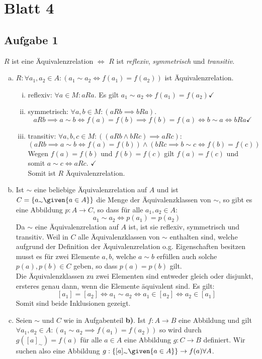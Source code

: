 \section*{Blatt 4}

	\subsection*{Aufgabe 1}
  $R$ ist eine Äquivalenzrelation $\iff$ $R$ ist \emph{reflexiv}, \emph{symmetrisch} und \emph{transitiv}.
  \begin{enumerate}[a)]
  \item $R: \forall a_1,a_2 \in A: (a_1 \sim a_2 \iff f(a_1)=f(a_2))$ ist Äquivalenzrelation. \\

    \begin{enumerate}[i)]
      \item reflexiv: $\forall a \in M: aRa$. Es gilt $a_1 \sim a_2 \iff f(a_1) = f(a_2) \checkmark$
      \item symmetrisch: $ \forall a, b \in M: (aRb \implies bRa)$. \\
      \[ aRb \implies a \sim b \iff f(a) = f(b) \implies f(b) = f(a) \iff b \sim a \iff bRa  \checkmark \]
      \item transitiv: $ \forall a,b,c \in M: ((aRb \land bRc) \implies aRc)  $:\\
      \[  (aRb \implies a \sim b \iff f(a) = f(b)) \land (bRc \implies b \sim c \iff f(b) = f(c))  \]
      Wegen $f(a) = f(b)$ und $f(b) = f(c)$ gilt $f(a)=f(c)$ und somit $a \sim c \iff aRc$. $\checkmark$ \\
      Somit ist $R$ Äquivalenzrelation.
    \end{enumerate}
  \item Ist $\sim$ eine beliebige Äquivalenzrelation auf $A$ und ist $C = \{a_{\sim} \given{ a \in A} \}$ die Menge der Äquivalenzklassen von $\sim$, so gibt es eine Abbildung $p: A \to C$, so dass für alle $a_1, a_2 \in A$:\\
    \[a_1 \sim a_2 \iff p(a_1) = p(a_2)\]
  Da $\sim$ eine Äquivalenzrelation auf $A$ ist, ist sie reflexiv, symmetrisch und transitiv. Weil in $C$ alle Äquivalenzklassen von $\sim$ enthalten sind, welche aufgrund der Definition der Äquivalenzrelation o.g. Eigenschaften besitzen musst es für zwei Elemente $a, b$, welche $a \sim b$ erfüllen auch solche $p(a), p(b) \in C$ geben, so dass $p(a) = p(b)$ gilt. \\
  Die Äquivalenzklassen zu zwei Elementen sind entweder gleich oder disjunkt, ersteres genau dann, wenn die Elemente äquivalent sind. Es gilt:
  \[ [a_1] = [a_2] \iff a_1 \sim a_2 \iff a_1 \in [a_2] \iff a_2 \in [a_1]   \]
  Somit sind beide Inklusionen gezeigt.
  \item Seien $\sim$ und $C$ wie in Aufgabenteil \textbf{b)}. Ist $f : A \to B$ eine Abbildung und gilt $\forall a_1,a_2 \in A: (a_1 \sim a_2 \implies f(a_1)=f(a_2))$
so wird durch $g([a]_{\sim}) = f(a)$ für alle $a \in A$ eine Abbildung $g : C \to B$ definiert.
  Wir suchen also eine Abbildung $g: \{ [a]_{\sim} \given{a \in A} \} \to f(a) \forall A $.


\end{enumerate}
